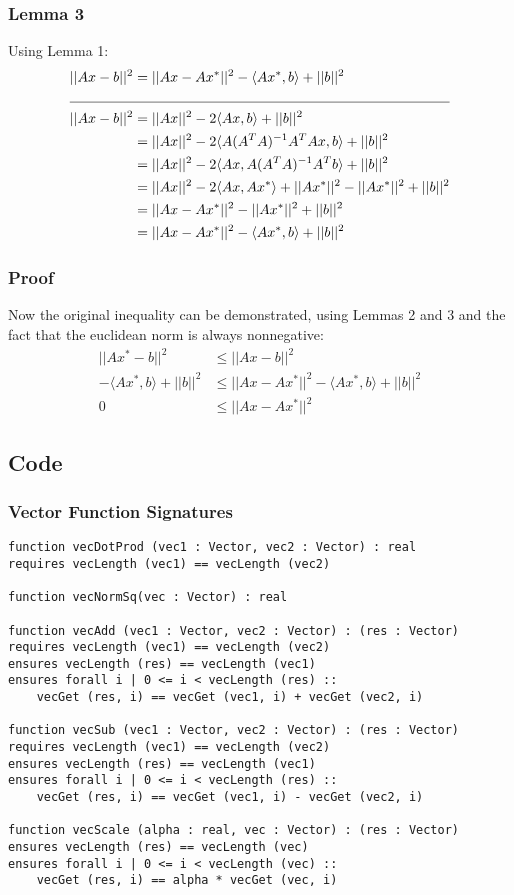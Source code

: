 \documentclass[12pt]{article}
\begin{document}
\subsubsection{Lemma 3}
Using Lemma 1:
\begin{align*}
||Ax - b||^2 &= ||Ax - Ax^*||^2 - \langle Ax^*, b \rangle + ||b||^2 \\
\cline{1 - 2}
||Ax - b||^2 &= ||Ax||^2 - 2 \langle Ax, b \rangle + ||b||^2 \\
 &= ||Ax||^2 - 2 \langle A (A^T A)^{-1} A^T A x, b \rangle + ||b||^2 \\
 &= ||Ax||^2 - 2 \langle Ax, A (A^T A)^{-1} A^T b \rangle + ||b||^2 \\
 &= ||Ax||^2 - 2 \langle Ax, Ax^* \rangle + ||Ax^*||^2 - ||Ax^*||^2 + ||b||^2 \\
 &= ||Ax - Ax^*||^2 - ||Ax^*||^2 + ||b||^2 \\
 &= ||Ax - Ax^*||^2 - \langle Ax^*, b \rangle + ||b||^2
\end{align*}

\subsubsection{Proof}
Now the original inequality can be demonstrated, using Lemmas 2 and 3 and the fact that the euclidean norm is always nonnegative:
\begin{align*}
||Ax^* - b||^2 &\le ||Ax - b||^2 \\
-\langle Ax^*, b \rangle + ||b||^2 &\le ||Ax - Ax^*||^2 - \langle Ax^*, b \rangle + ||b||^2 \\
0 &\le ||Ax - Ax^*||^2
\end{align*}

\subsection{Code}
\subsubsection{Vector Function Signatures}
\label{sec:vectorsigs}
\begin{verbatim}
function vecDotProd (vec1 : Vector, vec2 : Vector) : real
requires vecLength (vec1) == vecLength (vec2)

function vecNormSq(vec : Vector) : real

function vecAdd (vec1 : Vector, vec2 : Vector) : (res : Vector)
requires vecLength (vec1) == vecLength (vec2)
ensures vecLength (res) == vecLength (vec1)
ensures forall i | 0 <= i < vecLength (res) ::
    vecGet (res, i) == vecGet (vec1, i) + vecGet (vec2, i)

function vecSub (vec1 : Vector, vec2 : Vector) : (res : Vector)
requires vecLength (vec1) == vecLength (vec2)
ensures vecLength (res) == vecLength (vec1)
ensures forall i | 0 <= i < vecLength (res) ::
    vecGet (res, i) == vecGet (vec1, i) - vecGet (vec2, i)

function vecScale (alpha : real, vec : Vector) : (res : Vector)
ensures vecLength (res) == vecLength (vec)
ensures forall i | 0 <= i < vecLength (vec) ::
    vecGet (res, i) == alpha * vecGet (vec, i)
\end{verbatim}
\end{document}
